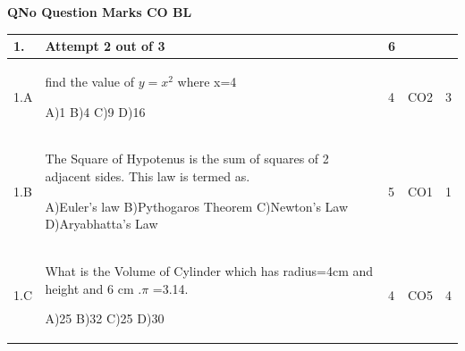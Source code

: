 \documentclass[12pt]{article}
\begin{document}
	\begin{flushleft}
	\bf{QNo}\hspace{1.2cm} \bf{Question} \hspace{5.5cm}  \bf{Marks} \hspace{0.2cm} \bf{CO} \hspace{0.2cm}	\bf{BL}	
	
\end{flushleft} 
	\begin{longtable}{|L{1cm}|L{8cm}|C{1cm}|C{1cm}|C{1cm}|}\hline
		\bf{1}. & \bf{Attempt} \bf2 \bf{out} of \bf3 & \bf6  & & \\ \hline
				1.A & find the value of   $y=x^{2}$  where x=4 \newline
					
		A)1\newline
		B)4\newline
		C)9\newline
		D)16 &
		4 &
		CO2&
		3 \\ \hline
		
				1.B & The Square of Hypotenus is the sum of squares of 2 adjacent sides. This law is termed as. \newline
					
		A)Euler's law\newline
		B)Pythogaros  Theorem\newline
		C)Newton's Law\newline
		D)Aryabhatta's Law &
		5 &
		CO1&
		1 \\ \hline
		
				1.C & What is the Volume of Cylinder which has radius=4cm and height and 6 cm .$\pi$ =3.14. \newline
					
		A)25\newline
		B)32\newline
		C)25\newline
		D)30 &
		4 &
		CO5&
		4 \\ \hline
		
		
	\end{longtable}
\end{document}
